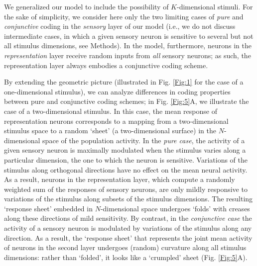 \documentclass[a4paper]{article}%
\begin{document}
We generalized our model to include the possibility of $K$-dimensional
stimuli. For the sake of simplicity, we consider here only the two limiting
cases of \textit{pure} and \textit{conjunctive} coding in the \textit{sensory}
layer of our model (i.e., we do not discuss intermediate cases, in which a
given sensory neuron is sensitive to several but not all stimulus dimensions,
see Methods). In the model, furthermore, neurons in the
\textit{representation} layer receive random inputs from \textit{all} sensory
neurons; as such, the representation layer always embodies a conjunctive
coding scheme.

By extending the geometric picture (illustrated in Fig. \ref{Fig:1} for the
case of a one-dimensional stimulus), we can analyze differences in coding
properties between pure and conjunctive coding schemes; in Fig. \ref{Fig:5}A,
we illustrate the case of a two-dimensional stimulus. In this case, the mean
response of representation neurons corresponds to a mapping from a
two-dimensional stimulus space to a random `sheet' (a two-dimensional surface)
in the $N$-dimensional space of the population activity. In the \textit{pure
case}, the activity of a given sensory neuron is maximally modulated when the
stimulus varies along a particular dimension, the one to which the neuron is
sensitive. Variations of the stimulus along orthogonal directions have no
effect on the mean neural activity. As a result, neurons in the representation
layer, which compute a randomly weighted sum of the responses of sensory
neurons, are only mildly responsive to variations of the stimulus along
subsets of the stimulus dimensions. The resulting `response sheet' embedded in
$N$-dimensional space undergoes `folds' with creases along these directions of
mild sensitivity. By contrast, in the \textit{conjunctive case} the activity
of a sensory neuron is modulated by variations of the stimulus along any
direction. As a result, the `response sheet' that represents the joint mean
activity of neurons in the second layer undergoes (random) curvature along all
stimulus dimensions: rather than `folded', it looks like a `crumpled' sheet
(Fig. \ref{Fig:5}A).
\end{document}
